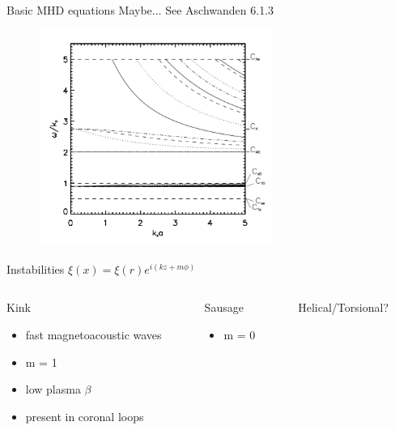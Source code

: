 \documentclass[table]{beamer}
\begin{document}
\begin{frame}{Basic MHD equations}
    Maybe$\ldots$ See Aschwanden 6.1.3
\end{frame}

\begin{frame}
    \begin{figure}
        \includegraphics[width=3in]{disp_diagram.png}
    \end{figure}
\end{frame}

\begin{frame}{Instabilities}
$ \xi(x) = \xi(r)e^{i(kz+m\phi)}  $
\begin{columns}
    \begin{column}{0.33\textwidth}
    Kink
    \begin{itemize}
        \item fast magnetoacoustic waves
        \item m = 1
        \item low plasma $\beta$
        \item present in coronal loops
    \end{itemize}
    \end{column}
    \begin{column}{0.33\textwidth}  %
    Sausage
        \begin{itemize}
            \item m = 0
        \end{itemize}
    \end{column}
    \begin{column}{0.33\textwidth}  %
    Helical/Torsional?
    \end{column}
\end{columns}
\end{frame}
\end{document}
